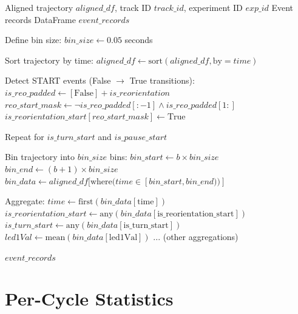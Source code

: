 \documentclass[
  11pt,
]{article}
\begin{document}
\begin{algorithm}[H]
\caption{Create Event Records}
\label{alg:create-events}
\begin{algorithmic}[1]
\REQUIRE Aligned trajectory $aligned\_df$, track ID $track\_id$, experiment ID $exp\_id$
\ENSURE Event records DataFrame $event\_records$

\STATE Define bin size: $bin\_size \leftarrow 0.05$ seconds

\STATE Sort trajectory by time: $aligned\_df \leftarrow \text{sort}(aligned\_df, \text{by}=time)$

\STATE Detect START events (False $\rightarrow$ True transitions):
\STATE \quad $is\_reo\_padded \leftarrow [\text{False}] + is\_reorientation$
\STATE \quad $reo\_start\_mask \leftarrow \neg is\_reo\_padded[:-1] \wedge is\_reo\_padded[1:]$
\STATE \quad $is\_reorientation\_start[reo\_start\_mask] \leftarrow \text{True}$

\STATE Repeat for $is\_turn\_start$ and $is\_pause\_start$

\STATE Bin trajectory into $bin\_size$ bins:
    \STATE $bin\_start \leftarrow b \times bin\_size$
    \STATE $bin\_end \leftarrow (b+1) \times bin\_size$
    \STATE $bin\_data \leftarrow aligned\_df[\text{where}(time \in [bin\_start, bin\_end))]$
    
    \STATE Aggregate:
    \STATE \quad $time \leftarrow \text{first}(bin\_data[\text{time}])$
    \STATE \quad $is\_reorientation\_start \leftarrow \text{any}(bin\_data[\text{is\_reorientation\_start}])$
    \STATE \quad $is\_turn\_start \leftarrow \text{any}(bin\_data[\text{is\_turn\_start}])$
    \STATE \quad $led1Val \leftarrow \text{mean}(bin\_data[\text{led1Val}])$
    \STATE \quad ... (other aggregations)
\ENDFOR

\RETURN $event\_records$
\end{algorithmic}
\end{algorithm}

\hypertarget{per-cycle-statistics}{%
\section{Per-Cycle Statistics}\label{per-cycle-statistics}}
\end{document}
